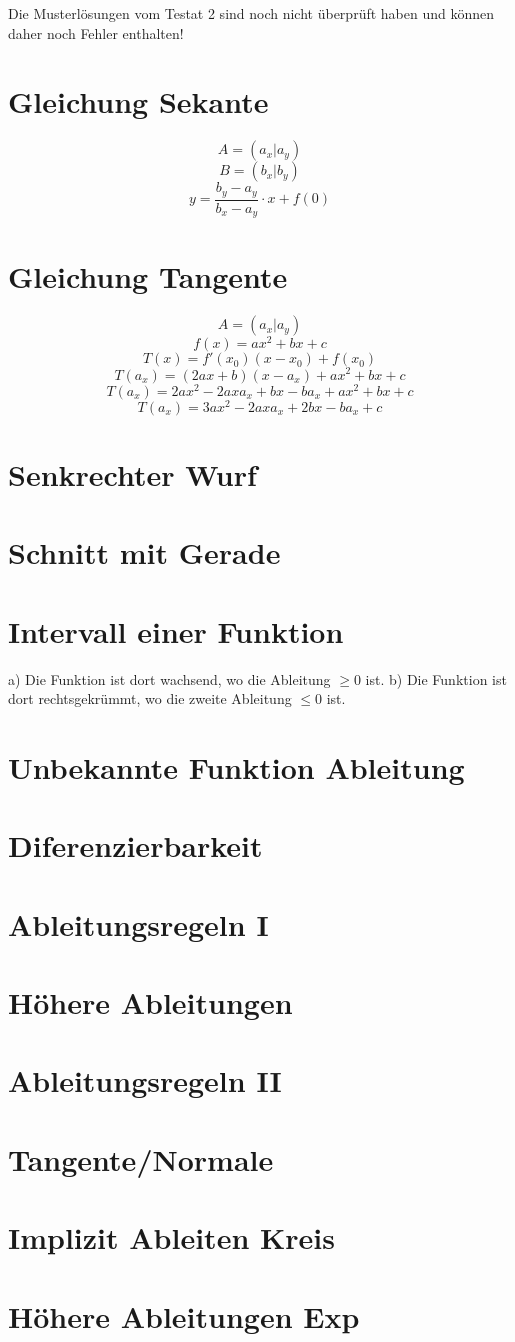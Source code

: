 Die Musterlösungen vom Testat 2 sind noch nicht überprüft haben und können daher noch Fehler enthalten! 
\section{Gleichung Sekante}
\[ A = (a_x | a_y) \]
\[ B = (b_x | b_y) \]
\[ y = \frac{b_y - a_y}{b_x - a_y} \cdot x + f(0) \]

\section{Gleichung Tangente}
\[ A = (a_x | a_y) \]
\[ f(x) = a x^2 + b x + c \]
\[ T(x) = f'(x_0)(x - x_0) + f(x_0) \]
\[ T(a_x) = (2 a x + b)(x - a_x) + a x^2 + b x + c \]
\[ T(a_x) = 2 a x^2 - 2 a x a_x + b x - b a_x + a x^2 + b x + c \]
\[ T(a_x) = 3 a x^2 - 2 a x a_x + 2 b x - b a_x + c \]

\section{Senkrechter Wurf}


\section{Schnitt mit Gerade}


\section{Intervall einer Funktion}
a) 
Die Funktion ist dort wachsend, wo die Ableitung $\geq 0$ ist. 
b) 
Die Funktion ist dort rechtsgekrümmt, wo die zweite Ableitung $\leq 0$ ist. 

\section{Unbekannte Funktion Ableitung}


\section{Diferenzierbarkeit}


\section{Ableitungsregeln I}


\section{Höhere Ableitungen}


\section{Ableitungsregeln II}


\section{Tangente/Normale}


\section{Implizit Ableiten Kreis}


\section{Höhere Ableitungen Exp}

